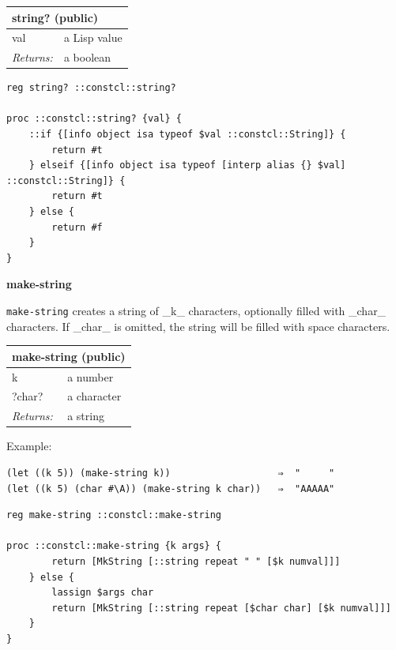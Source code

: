 \documentclass[twoside,9pt]{report}
\begin{document}
\noindent\makebox[\linewidth]{\rule{\linewidth}{0.4pt}}
\begin{tabular}{ |l l| }
\hline
\multicolumn{2}{|l|}{string? (public)} \\
\hline
val & a Lisp value \\
\textit{Returns:} & a boolean \\
\hline
\end{tabular}

\noindent\makebox[\linewidth]{\rule{\linewidth}{0.4pt}}
\begin{lstlisting}
reg string? ::constcl::string?
 
proc ::constcl::string? {val} {
    ::if {[info object isa typeof $val ::constcl::String]} {
        return #t
    } elseif {[info object isa typeof [interp alias {} $val] ::constcl::String]} {
        return #t
    } else {
        return #f
    }
}
\end{lstlisting}
\noindent\makebox[\linewidth]{\rule{\linewidth}{0.4pt}}

\textbf{make-string}


\texttt{make-string} creates a string of \_k\_ characters, optionally filled with \_char\_ characters. If \_char\_ is omitted, the string will be filled with space characters.

\begin{tabular}{ |l l| }
\hline
\multicolumn{2}{|l|}{make-string (public)} \\
\hline
k & a number \\
?char? & a character \\
\textit{Returns:} & a string \\
\hline
\end{tabular}


Example:

\noindent\makebox[\linewidth]{\rule{\linewidth}{0.4pt}}
\begin{lstlisting}
(let ((k 5)) (make-string k))                   ⇒  "     "
(let ((k 5) (char #\A)) (make-string k char))   ⇒  "AAAAA"
\end{lstlisting}
\noindent\makebox[\linewidth]{\rule{\linewidth}{0.4pt}}
\noindent\makebox[\linewidth]{\rule{\linewidth}{0.4pt}}
\begin{lstlisting}
reg make-string ::constcl::make-string
 
proc ::constcl::make-string {k args} {
        return [MkString [::string repeat " " [$k numval]]]
    } else {
        lassign $args char
        return [MkString [::string repeat [$char char] [$k numval]]]
    }
}
\end{lstlisting}
\noindent\makebox[\linewidth]{\rule{\linewidth}{0.4pt}}
\end{document}
